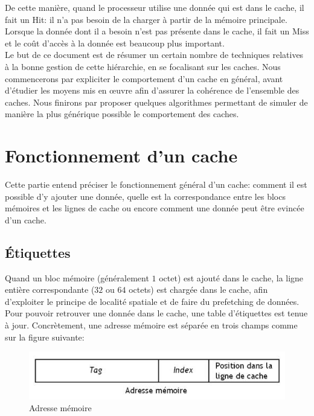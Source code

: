 \documentclass[a4paper]{article}
\begin{document}
\indent De cette manière, quand le processeur utilise une donnée qui est dans le cache, il fait un Hit: il n'a pas besoin de la charger à partir de la mémoire principale. Lorsque la donnée dont il a besoin n'est pas présente dans le cache, il fait un Miss et le coût d'accès à la donnée est beaucoup plus important. \\

\indent Le but de ce document est de résumer un certain nombre de techniques relatives à la bonne gestion de cette hiérarchie, en se focalisant sur les caches. Nous commencerons par expliciter le comportement d'un cache en général, avant d'étudier les moyens mis en {\oe}uvre afin d'assurer la cohérence de l'ensemble des caches. Nous finirons par proposer quelques algorithmes permettant de simuler de manière la plus générique possible le comportement des caches.

\newpage
\section{Fonctionnement d'un cache}
\indent Cette partie entend préciser le fonctionnement général d'un cache: comment il est possible d'y ajouter une donnée, quelle est la correspondance entre les blocs mémoires et les lignes de cache ou encore comment une donnée peut être evincée d'un cache.

\subsection{\'Etiquettes}
\indent Quand un bloc mémoire (généralement $1$ octet) est ajouté dans le cache, la ligne entière correspondante ($32$ ou $64$ octets) est chargée dans le cache, afin d'exploiter le principe de localité spatiale et de faire du prefetching de données. Pour pouvoir retrouver une donnée dans le cache, une table d'étiquettes est tenue à jour. Concrètement, une adresse mémoire est séparée en trois champs comme sur la figure suivante: \\

\begin{figure}[!h]
\begin{center}
   \includegraphics[scale=0.50]{etiquette.jpeg}
   \caption{\label{etiquette} Adresse mémoire}
\end{center}
\end{figure}
\end{document}
